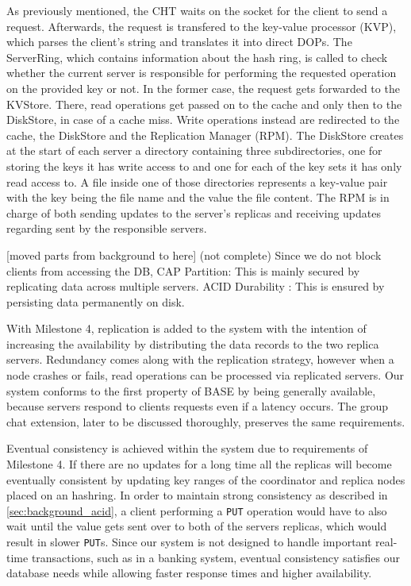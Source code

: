 As previously mentioned, the CHT waits on the socket for the client to send a request. Afterwards, the request is transfered to the key-value processor (KVP), which parses the client's string and translates it into direct DOPs. The ServerRing, which contains information about the hash ring, is called to check whether the current server is responsible for performing the requested operation on the provided key or not. In the former case, the request gets forwarded to the KVStore. There, read operations get passed on to the cache and only then to the DiskStore, in case of a cache miss. Write operations instead are redirected to the cache, the DiskStore and the Replication Manager (RPM). The DiskStore creates at the start of each server a directory containing three subdirectories, one for storing the keys it has write access to and one for each of the key sets it has only read access to. A file inside one of those directories represents a key-value pair with the key being the file name and the value the file content.
The RPM is in charge of both sending updates to the server's replicas and receiving updates regarding sent by the responsible servers.

[moved parts from background to here] (not complete)
Since we do not block clients from accessing the DB, 
CAP Partition: This is mainly secured by replicating data across multiple servers.
ACID Durability : This is ensured by persisting data permanently on disk.

With Milestone 4, replication is added to the system with the intention of increasing the availability by distributing the data records to the two replica servers. Redundancy comes along with the replication strategy, however when a node crashes or fails, read operations can be processed via replicated servers.
Our system conforms to the first property of BASE by being generally available, because servers respond to clients requests even if a latency occurs. The group chat extension, later to be discussed thoroughly, preserves the same requirements.

Eventual consistency is achieved within the system due to requirements of Milestone 4. If there are no updates for a long time all the replicas will become eventually consistent by updating key ranges of the coordinator and replica nodes placed on an hashring. In order to maintain strong consistency as described in \ref{sec:background_acid}, a client performing a \texttt{PUT} operation would have to also wait until the value gets sent over to both of the servers replicas, which would result in slower \texttt{PUT}s. Since our system is not designed to handle important real-time transactions, such as in a banking system, eventual consistency satisfies our database needs while allowing faster response times and higher availability. 

